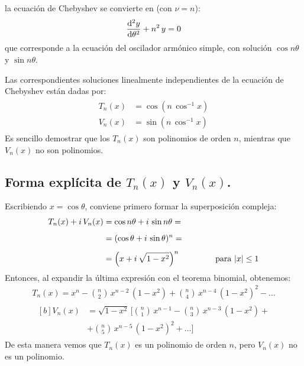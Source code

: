 \documentclass[12pt]{article}
\numberwithin{equation}{section}
\begin{document}
la ecuación de Chebyshev se convierte en (con $\nu = n$):
\begin{align*}
\dv[2]{y}{\theta} + n^{2} \, y = 0
\end{align*}
que corresponde a la ecuación del oscilador armónico simple, con solución $\cos n \theta$ y $\sin n \theta$. 
\par
Las correspondientes soluciones linealmente independientes de la ecuación de Chebyshev están dadas por:
\begin{align}
\begin{aligned}
T_{n} (x) &= \cos (n \, \cos^{-1} x) \\[0.5em]
V_{n} (x) &= \sin (n \, \cos^{-1} x)
\end{aligned}
\label{eq:ecuacion_18_055}
\end{align}
Es sencillo demostrar que los $T_{n} (x)$ son polinomios de orden $n$, mientras que $V_{n} (x)$ no son polinomios.

\subsection{Forma explícita de \texorpdfstring{$T_{n}(x)$}{T(n)(x)} y \texorpdfstring{$V_{n}(x)$}{Vn(x)}.}

Escribiendo $x = \cos \theta$, conviene primero formar la superposición compleja:
\begin{align*}
T_{n}(x) + i \, V_{n} (x) &= \cos n \theta + i \, \sin n \theta = \\[0.5em]
&= (\cos \theta + i \, \sin \theta)^{n} = \\[0.5em]
&= \left( x + i \, \sqrt{1- x^{2}} \right)^{n} \hspace{1.5cm} \mbox{para  } \abs{x} \leq 1
\end{align*}
Entonces, al expandir la última expresión con el teorema binomial, obtenemos:
\begin{align}
T_{n}(x) = x^{n} - \binom{n}{2} \, x^{n-2} \, (1 - x^{2}) + \binom{n}{4} \, x^{n-4} \, (1 - x^{2})^{2} - \ldots \label{eq:ecuacion_18_056}
\end{align}
\begin{align}
\begin{aligned}[b]
V_{n}(x) &= \sqrt{1 - x^{2}} \, \bigg[ \binom{n}{1} \, x^{n-1} - \binom{n}{3} \, x^{n-3} \, (1- x^{2}) + \\[0.5em]
&+ \binom{n}{5} \, x^{n-5} \, (1- x^{2})^{2} + \ldots \bigg]
\end{aligned}
\label{eq:ecuacion_18_057}
\end{align}
De esta manera vemos que $T_{n}(x)$ es un polinomio de orden $n$, pero $V_{n}(x)$ no es un polinomio.
\end{document}

